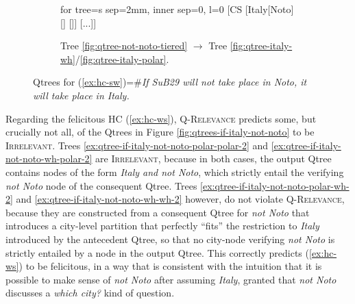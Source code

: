 \begin{figure}[H]
\begin{subfigure}[b]{.25\linewidth}
	\centering
	\scalebox{.7}
	{\begin{forest}for tree={s sep=2mm, inner sep=0, l=0}
			[CS [Italy[{Noto}] [] []]  [...]]
	\end{forest}}
	\caption{Tree \ref{fig:qtree-not-noto-tiered} $\rightarrow$ Tree \ref{fig:qtree-italy-wh}/\ref{fig:qtree-italy-polar}.}\label{fig:qtree-if-not-noto-italy-tiered-wh-2}
\end{subfigure}
\caption{Qtrees for (\ref{ex:hc-sw})=\#\textit{If SuB29 will not take place in Noto, it will take place in Italy.}}
\end{figure}

Regarding the felicitous HC (\ref{ex:hc-ws}), \textsc{Q-Relevance} predicts some, but crucially not all, of the Qtrees in Figure \ref{fig:qtrees-if-italy-not-noto} to be \textsc{Irrelevant}. Trees \ref{ex:qtree-if-italy-not-noto-polar-polar-2} and \ref{ex:qtree-if-italy-not-noto-wh-polar-2} are \textsc{Irrelevant}, because in both cases, the output Qtree contains nodes of the form \textit{Italy and not Noto}, which strictly entail the verifying \textit{not Noto} node of the consequent Qtree. Trees \ref{ex:qtree-if-italy-not-noto-polar-wh-2} and \ref{ex:qtree-if-italy-not-noto-wh-wh-2} however, do not violate \textsc{Q-Relevance}, because they are constructed from a consequent Qtree for \textit{not Noto} that introduces a city-level partition that perfectly ``fits'' the restriction to \textit{Italy} introduced by the antecedent Qtree, so that no city-node verifying \textit{not Noto} is strictly entailed by a node in the output Qtree. This correctly predicts (\ref{ex:hc-ws}) to be felicitous, in a way that is consistent with the intuition that it is possible to make sense of \textit{not Noto} after assuming \textit{Italy}, granted that \textit{not Noto} discusses a \textit{which city?} kind of question.




